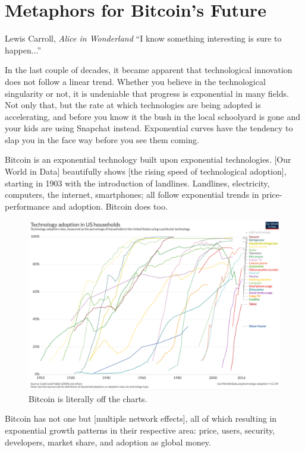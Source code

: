 \chapter{ Metaphors for Bitcoin's Future}
\label{les:21}

\begin{chapquote}{Lewis Carroll, \textit{Alice in Wonderland}}
``I know something interesting is sure to happen...''
\end{chapquote}

In the last couple of decades, it became apparent that technological
innovation does not follow a linear trend. Whether you believe in the
technological singularity or not, it is undeniable that progress is
exponential in many fields. Not only that, but the rate at which
technologies are being adopted is accelerating, and before you know it
the bush in the local schoolyard is gone and your kids are using
Snapchat instead. Exponential curves have the tendency to slap you in
the face way before you see them coming.

Bitcoin is an exponential technology built upon exponential
technologies. [Our World in Data] beautifully shows [the rising speed of
technological adoption], starting in 1903 with the introduction of
landlines. Landlines, electricity, computers, the internet, smartphones;
all follow exponential trends in price-performance and adoption. Bitcoin
does too.

\begin{figure}
  \includegraphics{assets/images/tech-adoption.png}
  \caption{Bitcoin is literally off the charts.}
  \label{fig:tech-adoption}
\end{figure}

Bitcoin has not one but [multiple network effects], all of which
resulting in exponential growth patterns in their respective area:
price, users, security, developers, market share, and adoption as global
money.

